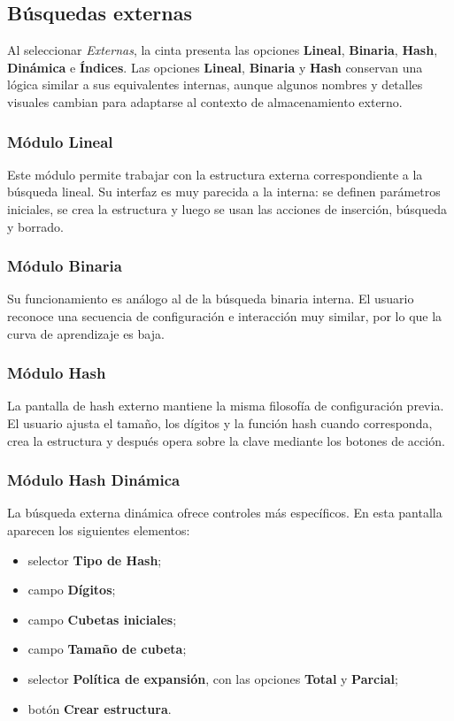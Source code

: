 \documentclass[10pt,onecolumn]{IEEEtran}
\begin{document}
\subsection{Búsquedas externas}
Al seleccionar \textit{Externas}, la cinta presenta las opciones \textbf{Lineal}, \textbf{Binaria}, \textbf{Hash}, \textbf{Dinámica} e \textbf{Índices}. Las opciones \textbf{Lineal}, \textbf{Binaria} y \textbf{Hash} conservan una lógica similar a sus equivalentes internas, aunque algunos nombres y detalles visuales cambian para adaptarse al contexto de almacenamiento externo.

\subsubsection{Módulo Lineal}
Este módulo permite trabajar con la estructura externa correspondiente a la búsqueda lineal. Su interfaz es muy parecida a la interna: se definen parámetros iniciales, se crea la estructura y luego se usan las acciones de inserción, búsqueda y borrado.

\subsubsection{Módulo Binaria}
Su funcionamiento es análogo al de la búsqueda binaria interna. El usuario reconoce una secuencia de configuración e interacción muy similar, por lo que la curva de aprendizaje es baja.

\subsubsection{Módulo Hash}
La pantalla de hash externo mantiene la misma filosofía de configuración previa. El usuario ajusta el tamaño, los dígitos y la función hash cuando corresponda, crea la estructura y después opera sobre la clave mediante los botones de acción.

\subsubsection{Módulo Hash Dinámica}
La búsqueda externa dinámica ofrece controles más específicos. En esta pantalla aparecen los siguientes elementos:
\begin{itemize}
  \item selector \textbf{Tipo de Hash};
  \item campo \textbf{Dígitos};
  \item campo \textbf{Cubetas iniciales};
  \item campo \textbf{Tamaño de cubeta};
  \item selector \textbf{Política de expansión}, con las opciones \textbf{Total} y \textbf{Parcial};
  \item botón \textbf{Crear estructura}.
\end{itemize}
\end{document}
